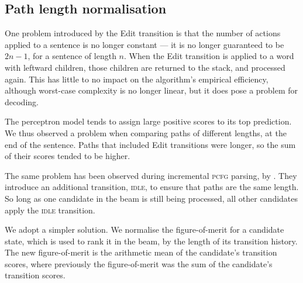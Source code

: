 \documentclass[11pt,letterpaper]{article}
\begin{document}



\subsection{Path length normalisation}

One problem introduced by the Edit transition is that the number of
actions applied to a sentence is no longer constant --- it is no longer guaranteed
to be $2n-1$, for a sentence of length $n$. When the Edit transition is
applied to a word with leftward children, those children are returned to the stack,
and processed again.  This has little to no impact on the algorithm's empirical
efficiency, although worst-case complexity is no longer linear, but it does
pose a problem for decoding.

The perceptron model tends to assign large positive scores to its top
prediction.
We thus observed a problem when comparing paths of different lengths, at the end
of the sentence. Paths that included Edit transitions were longer,
so the sum of their scores tended to be higher.

The same problem has been observed during incremental \textsc{pcfg} parsing,
by \citet{zhu:13}.  They introduce an additional transition, \textsc{idle},
to ensure that paths are the same length. So long as one candidate in the beam
is still being processed, all other candidates apply the \textsc{idle} transition.

We adopt a simpler solution.  We normalise the figure-of-merit for a candidate
state, which is used to rank
it in the beam, by the length of its transition history. The
new figure-of-merit is the arithmetic mean of the candidate's transition scores,
where previously the figure-of-merit was the sum of the candidate's transition
scores.
\end{document}
